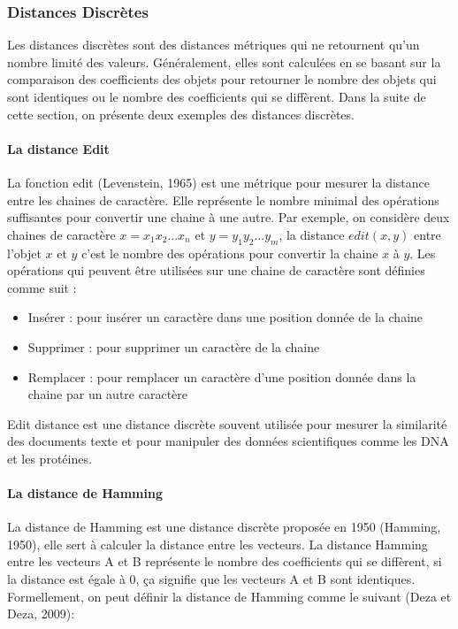 \subsubsection{Distances Discrètes}
Les distances discrètes sont des distances métriques qui ne retournent qu’un nombre limité des valeurs. Généralement, elles sont calculées en se basant sur la comparaison des coefficients des objets pour retourner le nombre des objets qui sont identiques ou le nombre des coefficients qui se diffèrent. Dans la suite de cette section, on présente deux exemples des distances discrètes.

\paragraph{La distance Edit}
La fonction edit (Levenstein, 1965) est une métrique pour mesurer la distance entre les chaines de caractère. Elle représente le nombre minimal des opérations suffisantes pour convertir une chaine à une autre. Par exemple, on considère deux chaines de caractère $x=x_1x_2...x_n$ et $y=y_1y_2...y_m$, la distance $edit(x,y)$ entre l’objet $x$ et $y$ c’est le nombre des opérations pour convertir la chaine $x$ à $y$. Les opérations qui peuvent être utilisées sur une
chaine de caractère sont définies comme suit :
\begin{itemize}
	\item Insérer : pour insérer un caractère dans une position donnée de la chaine
	\item Supprimer : pour supprimer un caractère de la chaine
	\item Remplacer : pour remplacer un caractère d’une position donnée dans la chaine par un autre caractère
\end{itemize}
Edit distance est une distance discrète souvent utilisée pour mesurer la similarité des documents texte et pour manipuler des données scientifiques comme les DNA et les protéines.

\paragraph{La distance de Hamming}
La distance de Hamming est une distance discrète proposée en 1950 (Hamming,
1950), elle sert à calculer la distance entre les vecteurs. La distance Hamming entre les vecteurs A et B représente le nombre des coefficients qui se diffèrent, si la distance est égale à 0, ça signifie que les vecteurs A et B sont identiques. Formellement, on peut définir la distance de Hamming comme le suivant (Deza et Deza, 2009):

